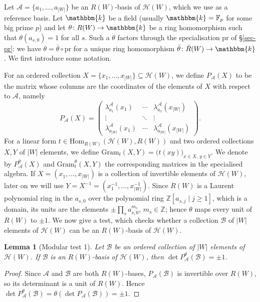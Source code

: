 \documentclass[11pt, reqno]{amsart}
\newcommand{\gram}{\mathrm{Gram}}
\newcommand{\cA}{\mathcal{A}}
\newcommand{\cB}{\mathcal{B}}
\newcommand{\cH}{\mathcal{H}}
\newcommand{\bk}{\mathbbm{k}}
\newcommand{\Hom}{\mathrm{Hom}}
\numberwithin{equation}{section}
\newtheorem{lemma}[theorem]{Lemma}
\theoremstyle{remark}
\begin{document}
	Let $\cA=\{a_1,\ldots,a_{|W|}\}$ be an $R(W)$-basis of $\cH(W)$, which we use as
	a reference basis. Let $\bk$ be a field (usually $\bk=\mathbb F_p$ for some big prime $p$) and let $\theta\colon R(W)\to\bk$ be a ring homomorphism such that
	$\theta(a_{s,0})=1$ for all $s$. Such a $\theta$ factors through the specialisation $\mathrm{pr}$ of \S\ref{sec-pr}: we have $\theta=\bar\theta\circ\mathrm{pr}$ for a unique ring homomorphism $\bar\theta\colon\bar R(W)\to \bk$. We first introduce some notation. 
	
	For an ordered collection
	$X=\{x_1,\ldots,x_{|W|}\}\subseteq\cH(W)$, we define $P_{\cA}(X)$ to be the
	matrix whose columns are the coordinates of the elements of $X$ with respect to
	$\cA$, namely
	\[
	P_{\cA}(X)=
	\begin{pmatrix}
		\lambda^{\cA}_{a_1}(x_1) & \cdots & \lambda^{\cA}_{a_1}(x_{|W|})\\
		\vdots & \ddots & \vdots\\
		\lambda^{\cA}_{a_{|W|}}(x_1) & \cdots & \lambda^{\cA}_{a_{|W|}}(x_{|W|})
	\end{pmatrix}.
	\]
	For a linear form $t\in\Hom_{R(W)}(\cH(W),R(W))$ and two ordered collections
	$X,Y$ of $|W|$ elements, we define $\gram_t(X,Y)=\bigl(t(xy)\bigr)_{x\in X,\,y\in Y}$.
	We denote by $P_{\cA}^{\theta}(X)$ and $\gram_t^{\theta}(X,Y)$ the corresponding
	matrices in the specialised algebra. If $X=(x_1,\dots,x_{|W|})$ is a collection of invertible elements of $\mathcal H(W)$, later on we will use  $Y=X^{-1}=(x_1^{-1},\dots,x_{|W|}^{-1})$. Since $R(W)$ is a Laurent polynomial ring in the $a_{s,0}$ over the polynomial ring $\mathbb Z[a_{s,j}\mid j\ge1]$, which is a domain, its units are the elements $\pm\prod_s a_{s,0}^{m_s}$, $m_s\in\mathbb Z$; hence $\theta$ maps every unit of $R(W)$ to $\pm1$. We now give a test, which checks whether a collection $\cB$ of $|W|$ elements of $\cH(W)$
	can be an $R(W)$-basis of $\cH(W)$.
	
	\begin{lemma}[Modular test 1]\label{mtest}
		Let $\cB$ be an ordered collection of $|W|$ elements of $\cH(W)$. If $\cB$ is an
		$R(W)$-basis of $\cH(W)$, then $\det P_{\cA}^{\theta}(\cB)=\pm1$.
	\end{lemma}
	\begin{proof}
		Since $\cA$ and $\cB$ are both $R(W)$-bases, $P_{\cA}(\cB)$ is invertible over
		$R(W)$, so its determinant is a unit of $R(W)$. Hence
		$\det P_{\cA}^{\theta}(\cB)=\theta(\det P_{\cA}(\cB))=\pm1$.
	\end{proof}
	
\end{document}

